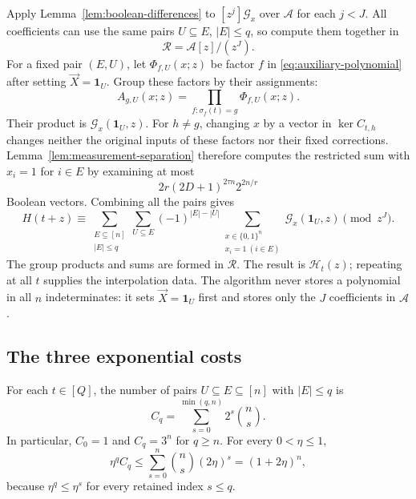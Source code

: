 \documentclass[11pt,reqno]{amsart}
\numberwithin{equation}{section}
\theoremstyle{definition}\newtheorem{definition}[theorem]{Definition}
\theoremstyle{remark}\newtheorem{remark}[theorem]{Remark}
\renewcommand{\le}{\leqslant}
\renewcommand{\ge}{\geqslant}
\begin{document}
Apply Lemma~\ref{lem:boolean-differences} to
$[z^j]\mathcal G_x$ over $\mathcal A$ for each $j<J$.
All coefficients can use the same pairs $U\subseteq E$, $|E|\le q$,
so compute them together in
\[
 \mathcal R=\mathcal A[z]/(z^J).
\]
For a fixed pair $(E,U)$, let $\Phi_{f,U}(x;z)$ be factor $f$
in \eqref{eq:auxiliary-polynomial} after setting $\vec X=\mathbf1_U$.
Group these factors by their assignments:
\begin{equation}\label{eq:group-polynomial}
 A_{g,U}(x;z)=\prod_{f:\sigma_f(t)=g}\Phi_{f,U}(x;z).
\end{equation}
Their product is $\mathcal G_x(\mathbf1_U,z)$.
For $h\ne g$, changing $x$ by a vector in $\ker C_{t,h}$ changes
neither the original inputs of these factors nor their fixed
corrections. Lemma~\ref{lem:measurement-separation} therefore
computes the restricted sum with $x_i=1$ for $i\in E$ by examining
at most
\begin{equation}\label{eq:boolean-enumeration}
 2r(2D+1)^{2\tau n}2^{2n/r}
\end{equation}
Boolean vectors. Combining all the pairs gives
\begin{equation}\label{eq:full-taylor-sum}
 H(t+z)\equiv
 \sum_{\substack{E\subseteq[n]\\|E|\le q}}
 \sum_{U\subseteq E}(-1)^{|E|-|U|}
 \sum_{\substack{x\in\{0,1\}^n\\x_i=1\ (i\in E)}}
       \mathcal G_x(\mathbf1_U,z)\pmod{z^J}.
\end{equation}
The group products and sums are formed in $\mathcal R$. The result is
$\mathcal H_t(z)$; repeating at all $t$ supplies the interpolation data.
The algorithm never stores a polynomial in all $n$ indeterminates:
it sets $\vec X=\mathbf1_U$ first and stores only the $J$ coefficients in $\mathcal A$.

\subsection{The three exponential costs}
\label{subsec:three-costs}
For each $t\in[Q]$,
the number of pairs $U\subseteq E\subseteq[n]$ with $|E|\le q$ is
\begin{equation}\label{eq:pair-count}
 C_q=\sum_{s=0}^{\min(q,n)}2^s\binom ns.
\end{equation}
In particular, $C_0=1$ and $C_q=3^n$ for $q\ge n$.
For every $0<\eta\le1$,
\begin{equation}\label{eq:finite-difference-cost}
 \eta^qC_q\le\sum_{s=0}^n\binom ns(2\eta)^s=(1+2\eta)^n,
\end{equation}
because $\eta^q\le\eta^s$ for every retained index $s\le q$.
\end{document}
